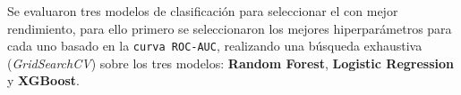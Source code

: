 \documentclass[12pt]{article}
\begin{document}
%
%
%
%
%
%
%
%
%
%
%
%

Se evaluaron tres modelos de clasificación para seleccionar el con mejor rendimiento, para ello primero se seleccionaron los mejores hiperparámetros para cada uno basado en la \texttt{curva ROC-AUC}, realizando una búsqueda exhaustiva (\textit{GridSearchCV}) sobre los tres modelos: \textbf{Random Forest}, \textbf{Logistic Regression} y \textbf{XGBoost}.
\end{document}
